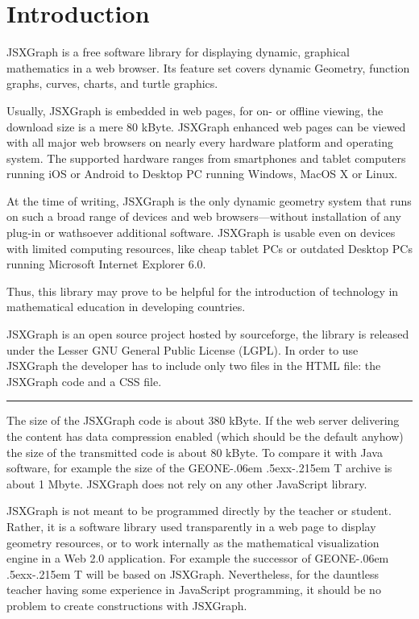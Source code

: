 \documentclass[12pt,a4paper]{article}%
\def\GEONExT{GEONE\kern-.06em \lower.5ex\hbox{x}\kern-.215em T}
\begin{document}
\section{Introduction}
JSXGraph is a free software library for displaying dynamic, graphical mathematics in a web browser.
Its feature set covers dynamic Geometry, function graphs, curves, 
charts, and turtle graphics.

Usually, JSXGraph is embedded in web pages, for on- or off\/line viewing, the download size is a mere
80 kByte.
JSXGraph enhanced web pages can be viewed with all major web browsers on nearly every hardware platform and operating system.
The supported hardware ranges from smartphones and tablet computers running iOS or Android  to
Desktop PC running Windows, MacOS X or Linux.

At the time of writing, JSXGraph is the only dynamic geometry system that runs  on such a broad range of 
devices and web browsers---without installation of any plug-in or wathsoever additional software.
JSXGraph is usable even on devices with limited computing resources, like cheap tablet PCs or
outdated Desktop PCs running Microsoft Internet Explorer 6.0. 

Thus, this library may prove to be helpful for the
introduction of technology in mathematical education in developing countries.




JSXGraph is an open source project hosted by sourceforge, 
the library is released under the Lesser GNU General Public License (LGPL). 
In order to use JSXGraph the developer has to include only two files in the 
HTML file: the JSXGraph code and a CSS file. 

\bigskip
\hrule
\bigskip

The  size 
of the JSXGraph code is about 380 kByte. If the web server delivering the 
content has data compression enabled (which should be the default anyhow) the 
size of the transmitted code is about 80 kByte. To compare it with Java software, 
for example the size of the \GEONExT{} archive is about 1 Mbyte. JSXGraph does not 
rely on any other JavaScript library.

JSXGraph is not meant to be programmed directly by the teacher or student. Rather, 
it is a software library used transparently in a web page to display geometry 
resources, or to work internally as the mathematical visualization engine in a 
Web 2.0 application. For example the successor of \GEONExT{} will be based on 
JSXGraph. Nevertheless, for the dauntless teacher having some experience in 
JavaScript programming, it should be no problem to create  constructions with 
JSXGraph.
\end{document}

